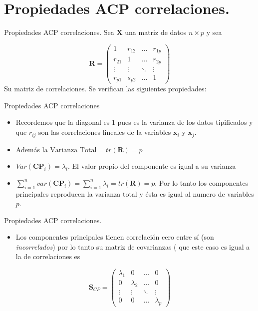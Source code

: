 \documentclass[
  ignorenonframetext,
]{beamer}
\providecommand{\tightlist}{%
  \setlength{\itemsep}{0pt}\setlength{\parskip}{0pt}}
\begin{document}
\section{Propiedades ACP
correlaciones.}\label{propiedades-acp-correlaciones.}

\begin{frame}{Propiedades ACP correlaciones.}
\label{propiedades-acp-correlaciones.-1}
Sea \(\mathbf{X}\) una matriz de datos \(n\times p\) y sea

\[\mathbf{R}=\left(\begin{array}{cccc}
1& r_{ 1 2}&\ldots &r_{1 p}\\
r_{2 1}& 1&\ldots &r_{2 p}\\
\vdots & \vdots & \ddots& \vdots\\
r_{p 1}& s_{ p 2}&\ldots &1
\end{array}
\right)\] Su matriz de correlaciones. Se verifican las siguientes
propiedades:
\end{frame}

\begin{frame}{Propiedades ACP correlaciones}
\label{propiedades-acp-correlaciones}
\begin{itemize}
\item
  Recordemos que la diagonal es \(1\) pues es la varianza de los datos
  tipificados y que \(r_{i j}\) son las correlaciones lineales de la
  variables \(\mathbf{x}_i\) y \(\mathbf{x}_j\).
\item
  Además la \(\mbox{Varianza Total}= tr(\mathbf{R})=p\)
\item
  \(Var(\mathbf{CP}_i)= \lambda_i\). El valor propio del componente es
  igual a su varianza
\item
  \(\sum_{i=1}^n var(\mathbf{CP}_i)=\sum_{i=1}^n
  \lambda_i=tr(\mathbf{R})=p\). Por lo tanto los componentes principales
  reproducen la varianza total y ésta es igual al numero de variables
  \(p\).
\end{itemize}
\end{frame}

\begin{frame}{Propiedades ACP correlaciones.}
\label{propiedades-acp-correlaciones.-2}
\begin{itemize}
\tightlist
\item
  Los componentes principales tienen correlación cero entre sí (son
  \emph{incorrelados}) por lo tanto su matriz de covarianzas ( que este
  caso es igual a la de correlaciones es
\end{itemize}

\[\mathbf{S}_{CP}=\left(\begin{array}{cccc}
\lambda_1& 0 &\ldots &0\\
0& \lambda_{2}&\ldots & 0\\
\vdots & \vdots &\ddots & \vdots\\
0 & 0&\ldots &\lambda_{p}
\end{array}
\right)\]
\end{frame}
\end{document}
